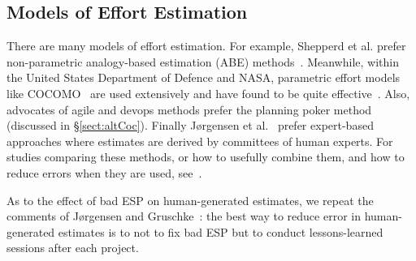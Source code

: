 \documentclass[final,twocolumn]{elsarticle}
\newcommand{\etal}{et al.}
\newcommand{\tion}[1]{\S\ref{sect:#1}}
\theoremstyle{break}
\begin{document}

  \subsection{Models of Effort Estimation}
  There are many models of effort estimation.
   For example, Shepperd et
 al. prefer non-parametric analogy-based estimation (ABE)
 methods~\cite{shepperd1997estimating}.  Meanwhile, within the
 United States Department of Defence and NASA,
 parametric effort models like
 COCOMO~\cite{boehm81} are used extensively and
 have found to be quite effective~\cite{lum02}.
 Also, advocates of agile and devops methods prefer
 the planning poker method (discussed in \tion{altCoc}).
 Finally J{\o}rgensen  et al.~\cite{jorgensen09} prefer
 expert-based approaches where estimates are derived
 by committees of human experts.  For studies
 comparing these methods, or how to usefully combine
 them, and how to reduce errors when they are used,
 see~\cite{koc11b,Minku2013,garg15,me13a}.

 

 
As to the effect of bad ESP on human-generated estimates, we repeat the comments of
J{\o}rgensen and Gruschke~\cite{jorgensen09}: the best way to reduce error
in human-generated estimates is to not to fix bad ESP but to
conduct lessons-learned sessions after each project. 
 
\end{document}
